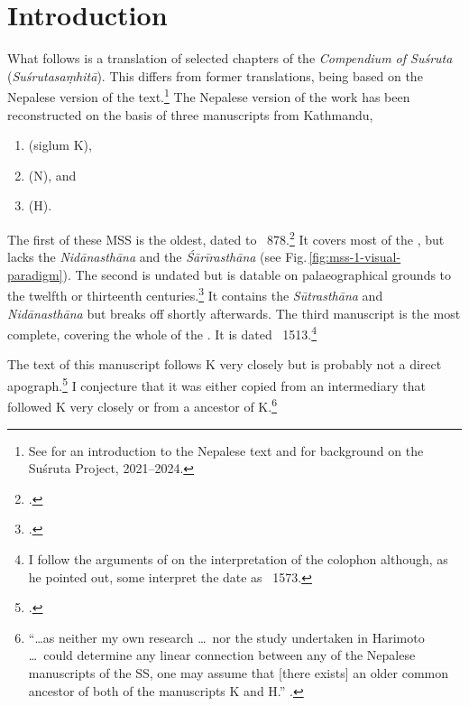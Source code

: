 
\chapter{Introduction}

What follows is a translation of selected chapters of the
\emph{Compendium of Suśruta} (\emph{Suśrutasaṃhitā}).  This differs
from former translations, being based on the Nepalese
version of the text.\footnote{See \cite{wuja-2023} for an
    introduction to the Nepalese text and \cite{wuja-2021b} for
    background on the Suśruta Project, 2021--2024.}  The Nepalese version of the 
    work has been reconstructed on the basis of three manuscripts from 
    Kathmandu, 
    \begin{enumerate}
        \item {} (siglum K),
        \item {} (N), and
        \item {} (H).
    \end{enumerate}
The first of these MSS is the oldest, dated to
\CE~878.\footcite[15]{kleb-2021b}  It covers most of the \SS, but
lacks the \emph{Nidānasthāna} and the \emph{Śārīrasthāna} (see 
Fig.\,\ref{fig:mss-1-visual-paradigm}).  The
second is undated but is datable on palaeographical grounds to the
twelfth or thirteenth centuries.\footcite[17--18]{kleb-2021b} It
contains the \emph{Sūtrasthāna} and \emph{Nidānasthāna} but breaks
off shortly afterwards.  The third manuscript is the most complete,
covering the whole of the \SS. It is dated \CE~1513.\footnote{I
    follow the arguments of \citet[21--26]{kleb-2021b} on the
    interpretation of the colophon although, as he pointed out, some
    interpret the date as \CE\ 1573.}  
    
The text of this manuscript follows K very closely but is probably
not a direct apograph.\footcite{chak-2022} I conjecture that it was
either copied from an intermediary that followed K very closely or
from a ancestor of K.\footnote{“\ldots as neither my own research
    \ldots\ nor the study undertaken in Harimoto \ldots\ could determine
    any linear connection between any of the Nepalese manuscripts of the
    SS, one may assume that [there exists] an older common ancestor of
    both of the manuscripts K and H.” \citep[21]{kleb-2021a}.}
        
